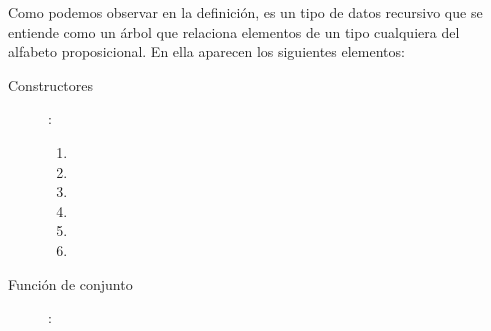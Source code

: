 \begin{isabellebody}
\begin{isamarkuptext}%
Como podemos observar en la definición,  es un tipo de datos recursivo que se 
entiende como un árbol que relaciona elementos de un tipo  cualquiera del alfabeto proposicional. 
En ella aparecen los siguientes elementos:
\begin{description}
\item[Constructores]:  
  \begin{enumerate} 
  \item {}  
  \item {}
  \item {}
  \item {}
  \item {}
  \item {}
  \end{enumerate}
\item[Función de conjunto]: 
\end{description}


\end{isamarkuptext}
\end{isabellebody}
